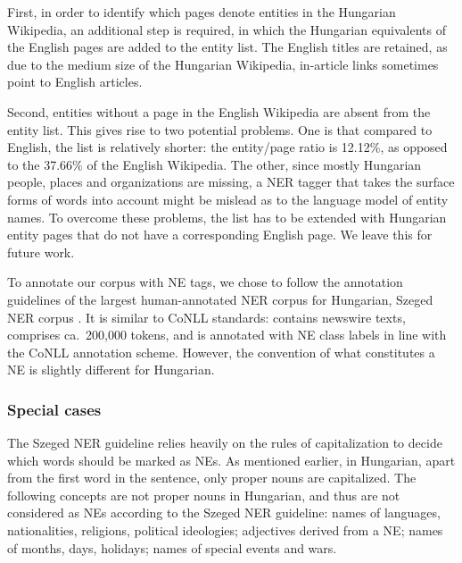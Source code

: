 \documentclass[11pt]{article}
\begin{document}
First, in order to identify which pages denote entities in the Hungarian Wikipedia, an additional step is required, in which the Hungarian equivalents of the English pages are added to the entity list. The English titles are retained, as due to the medium size of the Hungarian Wikipedia, in-article links sometimes point to English articles.

Second, entities without a page in the English Wikipedia are absent from the entity list. This gives rise to two potential problems. One is that compared to English, the list is relatively shorter: the entity/page ratio is 12.12\%, as opposed to the 37.66\% of the English Wikipedia. The other, since mostly Hungarian people, places and organizations are missing, a NER tagger that takes the surface forms of words into account might be mislead as to the language model of entity names. To overcome these problems, the list has to be extended with Hungarian entity pages that do not have a corresponding English page. We leave this for future work.

To annotate our corpus with NE tags, we chose to follow the annotation guidelines of the largest human-annotated NER corpus for Hungarian, Szeged NER corpus \cite{Szarvas:06}. It is similar to CoNLL standards: contains newswire texts, comprises ca.~200,000 tokens, and is annotated with NE class labels in line with the CoNLL annotation scheme. However, the convention of what constitutes a NE is slightly different for Hungarian. 

\subsubsection{Special cases}

The Szeged NER guideline relies heavily on the rules of capitalization to decide which words should be marked as NEs. As mentioned earlier, in Hungarian, apart from the first word in the sentence, only proper nouns are capitalized. The following concepts are not proper nouns in Hungarian, and thus are not considered as NEs according to the Szeged NER guideline: names of languages, nationalities, religions, political ideologies; adjectives derived from a NE; names of months, days, holidays; names of special events and wars.

\end{document}
